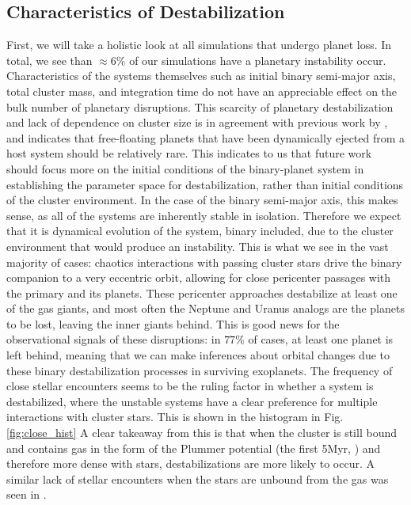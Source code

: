 \documentclass{aastex631}
\begin{document}
\subsection{Characteristics of Destabilization}
First, we will take a holistic look at all simulations that undergo planet loss. In total, we see than $\approx 6\%$ of our simulations
have a planetary instability occur. Characteristics of the systems themselves such 
as initial binary semi-major axis, total cluster mass, and integration time do not have an appreciable effect on the bulk number of 
planetary disruptions. This scarcity of planetary destabilization and lack of dependence
on cluster size is in agreement with previous work by \cite{dlfm99}, and indicates that free-floating
planets that have been dynamically ejected from a host system should be relatively rare. This indicates to us that future work
should focus more on the initial conditions of the binary-planet system in establishing the parameter space for destabilization, rather
than initial conditions of the cluster environment.
 In the case of the binary semi-major axis, this makes sense, as all of the systems are inherently stable in 
isolation. Therefore we expect that it is dynamical evolution of the system, binary included, due to the cluster environment that 
would produce an instability. This is what we see in the vast majority of cases: chaotics interactions with passing cluster stars 
drive the binary companion to a very eccentric orbit, allowing for close pericenter passages with the primary and its planets. 
These pericenter approaches destabilize at least one of the gas giants, and most often the Neptune and Uranus analogs are the planets 
to be lost, leaving the inner giants behind. This is good news for the observational signals of these disruptions: in $77\%$ of cases, 
at least one planet is left behind, meaning that we can make inferences about orbital changes due to these binary destabilization processes 
in surviving exoplanets. The frequency of close stellar encounters seems to be the ruling factor in whether a system is destabilized,
where the unstable systems have a clear preference for multiple interactions with cluster stars. This is shown in the histogram in Fig.\ref{fig:close_hist}
A clear takeaway from this is that when the cluster is still bound and contains gas 
in the form of the Plummer potential (the first 5Myr, \cite{all07}) and therefore more dense with stars, destabilizations are more likely to occur. A similar
lack of stellar encounters when the stars are unbound from the gas was seen in \cite{ada06}.
\end{document}
